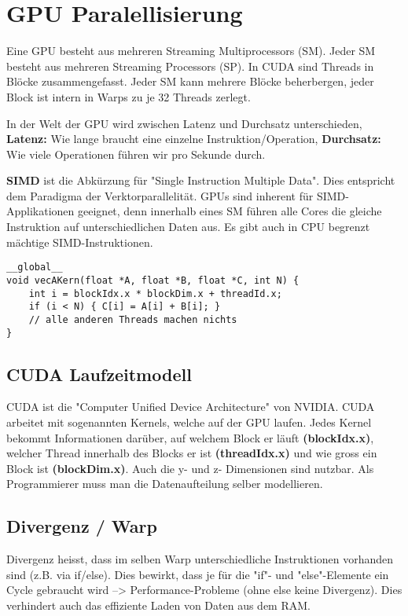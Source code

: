 \section{GPU Paralellisierung}
Eine GPU besteht aus mehreren Streaming Multiprocessors (SM). Jeder SM besteht aus mehreren Streaming Processors (SP). In CUDA sind Threads in Blöcke zusammengefasst. Jeder SM kann mehrere Blöcke beherbergen, jeder Block ist intern in Warps zu je 32 Threads zerlegt.

In der Welt der GPU wird zwischen Latenz und Durchsatz unterschieden, \textbf{Latenz:} Wie lange braucht eine einzelne Instruktion/Operation, \textbf{Durchsatz:} Wie viele Operationen führen wir pro Sekunde durch.

\textbf{SIMD} ist die Abkürzung für "Single Instruction Multiple Data". Dies entspricht dem Paradigma der Verktorparallelität. GPUs sind inherent für SIMD-Applikationen geeignet, denn innerhalb eines SM führen alle Cores die gleiche Instruktion auf unterschiedlichen Daten aus. Es gibt auch in CPU begrenzt mächtige SIMD-Instruktionen.

\begin{lstlisting}[style=csharp]
__global__
void vecAKern(float *A, float *B, float *C, int N) {
	int i = blockIdx.x * blockDim.x + threadId.x;
	if (i < N) { C[i] = A[i] + B[i]; }
	// alle anderen Threads machen nichts
}
\end{lstlisting}     

\subsection{CUDA Laufzeitmodell}
 CUDA ist die "Computer Unified Device Architecture" von NVIDIA. CUDA arbeitet mit sogenannten Kernels, welche auf der GPU laufen. Jedes Kernel bekommt Informationen darüber, auf welchem Block er läuft \textbf{(blockIdx.x)}, welcher Thread innerhalb des Blocks er ist \textbf{(threadIdx.x)} und wie gross ein Block ist \textbf{(blockDim.x)}. Auch die y- und z- Dimensionen sind nutzbar. Als Programmierer muss man die Datenaufteilung selber modellieren.
 
\subsection{Divergenz / Warp}
Divergenz heisst, dass im selben Warp unterschiedliche Instruktionen vorhanden sind (z.B. via if/else). Dies bewirkt, dass je für die "if"- und "else"-Elemente ein Cycle gebraucht wird –> Performance-Probleme (ohne else keine Divergenz). Dies verhindert auch das effiziente Laden von Daten aus dem RAM.

